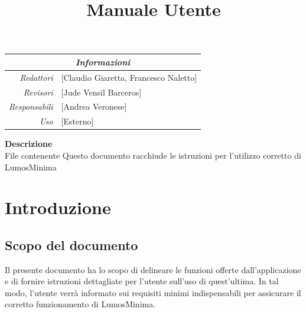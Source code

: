 \documentclass[9pt]{article}
\begin{document}
\graphicspath{ {../templates/img/} {./img}}
\setcounter{tocdepth}{4}
\setcounter{secnumdepth}{4}
\title{Manuale Utente}

\firstPage
\maketitle

\begin{center}
	\begin{tabular}{r | l}
		\multicolumn{2}{c}{\textit{Informazioni}}        \\
		\hline

		\textit{Redattori}    &
		[Claudio Giaretta, Francesco Naletto]\makecell{} \\

		\textit{Revisori}     &
		[Jude Vensil Barceros]\makecell{}                \\
		\textit{Responsabili} &
		[Andrea Veronese]\makecell{}                     \\
		\textit{Uso}          &
		[Esterno]\makecell{}                             \\
	\end{tabular}
\end{center}

\begin{center}
	\textbf{Descrizione}\\
	File contenente Questo documento racchiude le istruzioni per l’utilizzo corretto di LumosMinima
\end{center}

\pagebreak

\printindex
\pagebreak





\makeversioni
\pagebreak
\tableofcontents
\pagebreak
\section{Introduzione}
\subsection{Scopo del documento}
Il presente documento ha lo scopo di delineare le funzioni offerte dall'applicazione e di fornire istruzioni dettagliate per l'utente sull'uso di quest'ultima.
In tal modo, l'utente verrà informato sui requisiti minimi indispensabili per assicurare il corretto funzionamento di LumosMinima.
\end{document}
